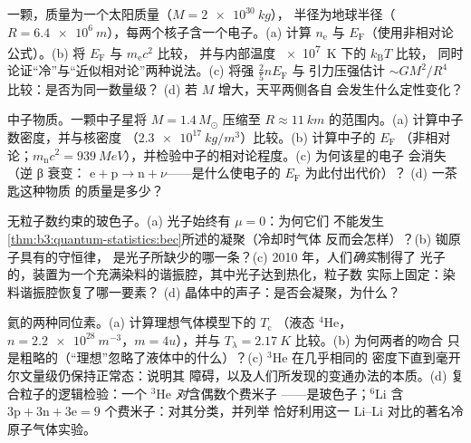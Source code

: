 \begin{exercise}[$\star\star$]\label{exo:b3:quantum-statistics:6}
一颗，质量为一个太阳质量（$M = \qty{2e30}{kg}$），
半径为地球半径（$R = \qty{6.4e6}{m}$），每两个核子含一个电子。(a)
计算 $n_{\text{e}}$ 与 $E_{\text{F}}$（使用非相对论
公式）。(b) 将 $E_{\text{F}}$ 与 $m_{\text{e}}c^2$ 比较，
并与内部温度 \qty{e7}{K} 下的 $k_{\text{B}}T$ 比较，
同时论证“冷”与“近似相对论”两种说法。(c) 将强 $\tfrac25 nE_{\text{F}}$ 与
引力压强估计 $\sim GM^2/R^4$ 比较：是否为同一数量级？
(d) 若 $M$ 增大，天平两侧各自
会发生什么定性变化？
\end{exercise}

\begin{exercise}[$\star\star$]\label{exo:b3:quantum-statistics:7}
中子物质。一颗中子星将 $M = 1.4\,M_\odot$ 压缩至 $R
\approx \qty{11}{km}$ 的范围内。(a) 计算中子数密度，并与核密度
（$\qty{2.3e17}{kg/m^3}$）比较。(b) 计算中子的 $E_{\text{F}}$
（非相对论；$m_{\text{n}}c^2
= \qty{939}{MeV}$），并检验中子的相对论程度。(c) 为何该星的电子
会消失（逆 β 衰变：
$\text{e} + \text{p} \to \text{n} + \nu$——是什么使电子的 $E_{\text{F}}$ 为此付出代价）？
(d) 一茶匙这种物质
的质量是多少？
\end{exercise}

\begin{exercise}[$\star\star$]\label{exo:b3:quantum-statistics:8}
无粒子数约束的玻色子。(a) 光子始终有 $\mu = 0$：为何它们
不能发生
\cref{thm:b3:quantum-statistics:bec}所述的凝聚（冷却时气体
反而会怎样）？(b) 铷原子具有的守恒律，
是光子所缺少的哪一条？(c) 2010 年，人们\emph{确实}制得了
光子的，装置为一个充满染料的谐振腔，其中光子达到热化，粒子数
实际上固定：染料谐振腔恢复了哪一要素？
(d) 晶体中的声子：是否会凝聚，为什么？
\end{exercise}

\begin{exercise}[$\star\star$]\label{exo:b3:quantum-statistics:9}
氦的两种同位素。(a) 计算理想气体模型下的 $T_{\text{c}}$
（液态 $^4$He，$n = \qty{2.2e28}{m^{-3}}$，$m = 4u$），并与
$T_\lambda = \qty{2.17}{K}$ 比较。(b) 为何两者的吻合
只是粗略的（“理想”忽略了液体中的什么）？(c) $^3$He 在几乎相同的
密度下直到毫开尔文量级仍保持正常态：说明其
障碍，以及人们所发现的变通办法的本质。(d) 复合粒子的逻辑检验：一个 $^3$He \emph{对}含偶数个费米子
——是玻色子；$^6$Li 含 $3\text{p} + 3\text{n}
+ 3\text{e} = 9$ 个费米子：对其分类，并列举
恰好利用这一 Li–Li 对比的著名冷原子气体实验。
\end{exercise}


